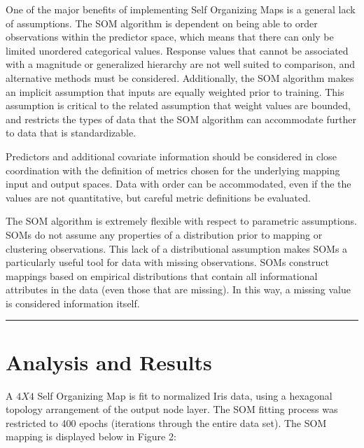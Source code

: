 \documentclass[12pt,]{article}
\begin{document}
One of the major benefits of implementing Self Organizing Maps is a
general lack of assumptions. The SOM algorithm is dependent on being
able to order observations within the predictor space, which means that
there can only be limited unordered categorical values. Response values
that cannot be associated with a magnitude or generalized hierarchy are
not well suited to comparison, and alternative methods must be
considered. Additionally, the SOM algorithm makes an implicit assumption
that inputs are equally weighted prior to training. This assumption is
critical to the related assumption that weight values are bounded, and
restricts the types of data that the SOM algorithm can accommodate
further to data that is standardizable.

Predictors and additional covariate information should be considered in
close coordination with the definition of metrics chosen for the
underlying mapping input and output spaces. Data with order can be
accommodated, even if the the values are not quantitative, but careful
metric definitions be evaluated.

The SOM algorithm is extremely flexible with respect to parametric
assumptions. SOMs do not assume any properties of a distribution prior
to mapping or clustering observations. This lack of a distributional
assumption makes SOMs a particularly useful tool for data with missing
observations. SOMs construct mappings based on empirical distributions
that contain all informational attributes in the data (even those that
are missing). In this way, a missing value is considered information
itself.

\begin{center}\rule{0.5\linewidth}{\linethickness}\end{center}

\newpage

\hypertarget{analysis-and-results}{%
\section{Analysis and Results}\label{analysis-and-results}}

A \(4X4\) Self Organizing Map is fit to normalized Iris data, using a
hexagonal topology arrangement of the output node layer. The SOM fitting
process was restricted to 400 epochs (iterations through the entire data
set). The SOM mapping is displayed below in Figure 2:
\end{document}
